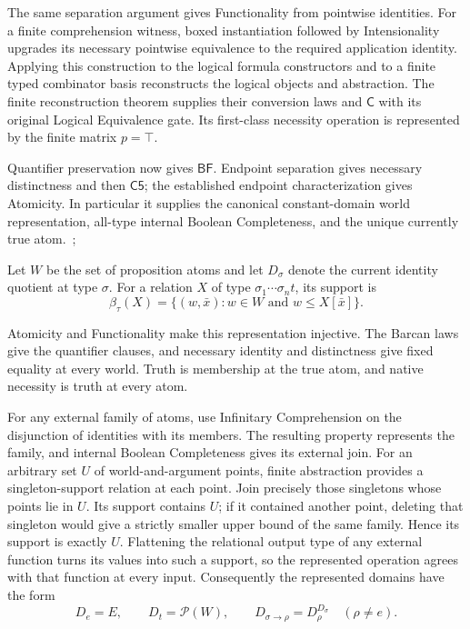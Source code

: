 \documentclass[12pt,letterpaper]{article}
\newcommand{\C}{\mathsf{C}}
\newcommand{\Cfive}{\mathsf{C5}}
\newcommand{\BF}{\mathsf{BF}}
\begin{document}
The same separation argument gives Functionality from pointwise identities. For a finite comprehension witness, boxed instantiation followed by Intensionality upgrades its necessary pointwise equivalence to the required application identity. Applying this construction to the logical formula constructors and to a finite typed combinator basis reconstructs the logical objects and abstraction. The finite reconstruction theorem supplies their conversion laws and $\C$ with its original Logical Equivalence gate. Its first-class necessity operation is represented by the finite matrix $p=\top$.~\cite[\S\S2--6]{r17}


Quantifier preservation now gives $\BF$. Endpoint separation gives necessary distinctness and then $\Cfive$; the established endpoint characterization gives Atomicity. In particular it supplies the canonical constant-domain world representation, all-type internal Boolean Completeness, and the unique currently true atom.~\cite[\S3]{r9};~\cite[\S2]{r16}


Let $W$ be the set of proposition atoms and let $D_\sigma$ denote the current identity quotient at type $\sigma$. For a relation $X$ of type $\sigma_1\cdots\sigma_n t$, its support is
\[
\beta_\tau(X)=\{(w,\bar x):w\in W\text{ and }w\le X[\bar x]\}.
\]

Atomicity and Functionality make this representation injective. The Barcan laws give the quantifier clauses, and necessary identity and distinctness give fixed equality at every world. Truth is membership at the true atom, and native necessity is truth at every atom.~\cite[\S3]{r16}


For any external family of atoms, use Infinitary Comprehension on the disjunction of identities with its members. The resulting property represents the family, and internal Boolean Completeness gives its external join. For an arbitrary set $U$ of world-and-argument points, finite abstraction provides a singleton-support relation at each point. Join precisely those singletons whose points lie in $U$. Its support contains $U$; if it contained another point, deleting that singleton would give a strictly smaller upper bound of the same family. Hence its support is exactly $U$. Flattening the relational output type of any external function turns its values into such a support, so the represented operation agrees with that function at every input. Consequently the represented domains have the form
\[
D_e=E,\qquad D_t=\mathcal P(W),\qquad D_{\sigma\to\rho}=D_\rho^{D_\sigma}\quad(\rho\ne e).
\]
\end{document}
